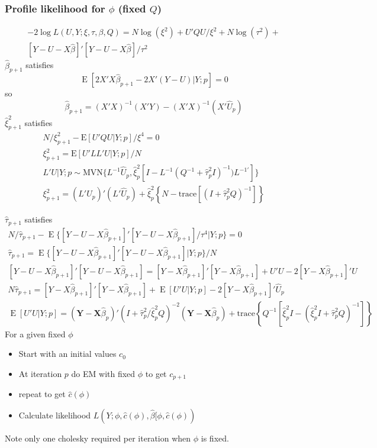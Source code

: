 \documentclass[12pt]{article}
\DeclareMathOperator{\E}{E}
\begin{document}
\subsubsection{Profile likelihood for $\phi$ (fixed $Q$)}
\begin{multline*}
-2 \log L(U,Y;\xi,\tau,\beta,Q) =
	N\log(\xi^2) + U'Q U/\xi^2 +
	N\log(\tau^2) +\\
	[Y-U-X\hat\beta]'[Y-U-X\hat\beta]/\tau^2
	\end{multline*}
$\hat\beta_{p+1}$ satisfies
\[
\E[ 2  X' X \hat\beta_{p+1} - 2 X'(Y - U) |Y ; p] = 0
 \]
 so
\[
 \hat\beta_{p+1} = (X'X)^{-1}(X'Y) - (X'X)^{-1}(X'\hat U_p)
\]
$\hat\xi^2_{p+1}$ satisfies
\begin{gather*}
N/\xi^2_{p+1} - \text{E}[ U'Q U |Y; p ]/\xi^4 = 0\\
\xi^2_{p+1} = \text{E}[ U'L L' U |Y; p ]/N\\
L'U|Y;p \sim  \text{MVN}\{
	L^{-1}\hat U_p,
\hat\xi_p^2[I - L^{-1}( Q^{-1} + \hat\tau_p^2 I  )^{-1}) L^{-1\prime}] \}\\
\xi^2_{p+1} = (L' \hat U_p )'(L'\hat U_p) + \hat\xi_p^2\left\{N-
\text{trace}\left[(I + \hat\tau_p^2 Q  )^{-1} \right]\right\}
\end{gather*}

$\hat\tau_{p+1}$ satisfies
\begin{gather*}
N /\hat\tau_{p+1} -
\E\{[Y-U-X\hat\beta_{p+1}]'[Y-U-X\hat\beta_{p+1}]/\tau^4|Y;p\}=0\\
\hat\tau_{p+1} = \E\{[Y-U-X\hat\beta_{p+1}]'[Y-U-X\hat\beta_{p+1}]|Y;p\}/N\\
[Y-U-X\hat\beta_{p+1}]'[Y-U-X\hat\beta_{p+1}]=
[Y-X\hat\beta_{p+1}]'[Y-X\hat\beta_{p+1}]
+ U'U -2 [Y-X\hat\beta_{p+1}]' U \\
N \hat\tau_{p+1} = [Y-X\hat\beta_{p+1}]'[Y-X\hat\beta_{p+1}]+
\E[U'U|Y;p] - 2 [Y-X\hat\beta_{p+1}]' \hat U_p\\
\E[U'U|Y;p] = (\mathbf{Y} -
\mathbf{X}\hat\beta_p)' ( I + \hat\tau^2_p/\hat\xi^2_p Q  )^{-2}  (\mathbf{Y} -
\mathbf{X}\hat\beta_p) + \text{trace}\left\{ Q^{-1}\left[\hat\xi_p^2 I-
(\hat\xi_p^2  I + \hat\tau_p^2Q )^{-1} \right]\right\}
\end{gather*}
For a given fixed $\phi$
\begin{itemize}
  \item Start with an initial values  $c_0$
  \item At iteration $p$  do EM with fixed $\phi$ to get $c_{p+1}$
  \item repeat to get $\hat c(\phi)$
  \item Calculate likelihood
  $L(Y;\phi,\hat c(\phi), \hat\beta[\phi,\hat c(\phi)) $
\end{itemize}
Note only one cholesky required per iteration when $\phi$ is fixed.
\end{document}
